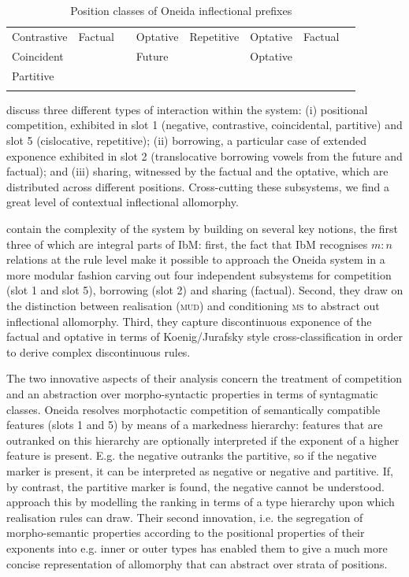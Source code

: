 \documentclass[output=paper
	        ,collection
	        ,collectionchapter
 	        ,biblatex
                ,babelshorthands
                ,newtxmath
                ,draftmode
                ,colorlinks, citecolor=brown
]{langscibook}
\begin{document}
{\begin{table}[htb]
\begin{tabular}{l|l|l|l|l|l|l|l}
    Contrastive & Factual & & Optative & Repetitive & Optative &
                                                                 Factual
                 & \\
    Coincident & & & Future & & Optative & &  \\
    Partitive & & & & & & &\\
    \lspbottomrule
  \end{tabular}
  \caption{Position classes of Oneida inflectional prefixes \citep{diaz:koenig:michelson:19}}
  \label{tab:Oneida}
\end{table}

\citet{diaz:koenig:michelson:19} discuss three different types of
interaction within the system: (i) positional competition, exhibited
in slot 1 (negative, contrastive, coincidental, partitive) and slot 5
(cislocative, repetitive); (ii) borrowing, a particular case of extended
exponence exhibited in slot 2 (translocative borrowing vowels from the
future and factual); and (iii) sharing, witnessed by the factual and
the optative, which are distributed across different positions. Cross-cutting these subsystems, we find a great level of
contextual inflectional allomorphy.

\citet{diaz:koenig:michelson:19} contain the complexity of the system
by building on several key notions, the first three of
which are integral parts of IbM: first, the fact that IbM recognises
$m:n$ relations at the rule level make it possible to approach the
Oneida system in a more modular fashion carving out four independent
subsystems for competition (slot 1 and slot 5), borrowing (slot 2) and
sharing (factual). Second, they draw on the distinction between
realisation (\textsc{mud}) and conditioning \textsc{ms} to abstract
out inflectional allomorphy. Third, they capture discontinuous
exponence of the factual and optative in terms of Koenig/Jurafsky
style cross-classification in order to derive complex discontinuous
rules.

The two innovative aspects of their analysis concern the treatment of
competition and an abstraction over morpho-syntactic properties in
terms of syntagmatic classes. Oneida resolves morphotactic competition
of semantically compatible features (slots 1 and 5) by means of a
markedness hierarchy: features that are outranked on this hierarchy
are optionally interpreted if the exponent of a higher feature is
present. E.g. the negative outranks the partitive, so if the negative
marker is present, it can be interpreted as negative or negative and
partitive. If, by contrast, the partitive marker is found, the
negative cannot be understood.  \citet{diaz:koenig:michelson:19}
approach this by modelling the ranking in terms of a type hierarchy
upon which realisation rules can draw. Their second innovation, i.e. 
the  segregation of morpho-semantic properties according to
the positional properties of their exponents into e.g. inner or outer
types has enabled them to give a much more concise representation of
allomorphy that can abstract over strata of positions. 

}
\end{document}
